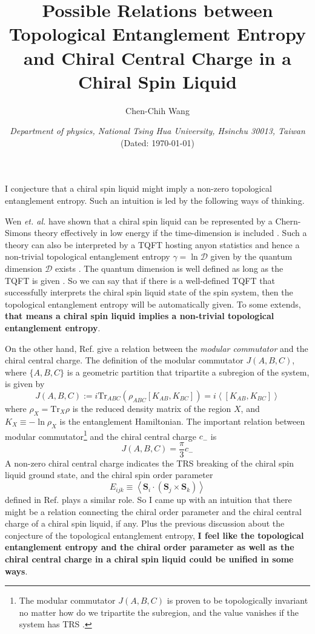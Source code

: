 \documentclass[12font]{article}
\title{\textbf{ Possible Relations between Topological Entanglement Entropy and Chiral Central Charge in a Chiral Spin Liquid}}
\author{Chen-Chih Wang  }
\date{\textit{Department of physics, National Tsing Hua University, Hsinchu 30013, Taiwan} \\ (Dated: \today)}
\theoremstyle{definition}
\numberwithin{equation}{section}
\newcommand{\anglelr}[1]{\left\langle #1 \right\rangle}
\newcommand{\lr}[1]{\left(  #1  \right)}
\newcommand{\mrm}[1]{\mathrm{#1}}
\newcommand{\bo}[1]{\mathbf{#1}}
\newcommand{\Tr}{\mrm{Tr}}
\begin{document}
\maketitle

I conjecture that a chiral spin liquid might imply a non-zero topological entanglement entropy. Such an intuition is led by the following ways of thinking.

Wen \emph{et. al.} have shown that a chiral spin liquid can be represented by a Chern-Simons theory effectively in low energy if the time-dimension is included \cite{WenChiral}. Such a theory can also be interpreted by a TQFT hosting anyon statistics and hence a non-trivial topological entanglement entropy $\gamma = \ln \mathcal{D}$ given by the quantum dimension $\mathcal{D}$ exists \cite{LevinTEE, topoEE}. The quantum dimension is well defined as long as the TQFT is given \cite{Witten}. So we can say that if there is a well-defined TQFT that successfully interprets the chiral spin liquid state of the spin system, then the topological entanglement entropy will be automatically given. To some extends, \textbf{that means a chiral spin liquid implies a non-trivial topological entanglement entropy}. 

On the other hand, Ref.\cite{ModularComB, PRL128, PRL129} give a relation between the \emph{modular commutator} and the chiral central charge. The definition of the modular commutator $J(A,B,C)$, where $\{A,B,C\}$  is a geometric partition that tripartite a subregion of the system, is given by 
\[
J(A,B,C) := i\Tr_{ABC}\lr{\rho_{ABC}[K_{AB}, K_{BC}]} = i\anglelr{[K_{AB}, K_{BC}]}
\]  
where $\rho_X=\Tr_X\rho$ is the reduced density matrix of the region $X$, and $K_{X}\equiv -\ln\rho_X$ is the entanglement Hamiltonian. The important relation between modular commutator\footnote{The modular commutator $J(A,B,C)$ is proven to be topologically invariant no matter how do we tripartite the subregion, and the value vanishes if the system has TRS \cite{ModularComB}.} and the chiral central charge $c_-$ is
\[
J(A,B,C) = \frac{\pi}{3}c_-
\]
A non-zero chiral central charge indicates the TRS breaking of the chiral spin liquid ground state, and the chiral spin order parameter 
\[
E_{ijk} \equiv \anglelr{\bo{S}_i\cdot\lr{\bo{S}_j\times\bo{S}_k}}
\]
defined  in Ref.\cite{WenChiral} plays a similar role. So I came up with an intuition that there might be a relation connecting the chiral order parameter and the chiral central charge of a chiral spin liquid, if any. Plus the previous discussion about the conjecture of the topological entanglement entropy, \textbf{I feel like the topological entanglement entropy and the chiral order parameter as well as the chiral central charge in a chiral spin liquid could be unified in some ways}.
\end{document}
